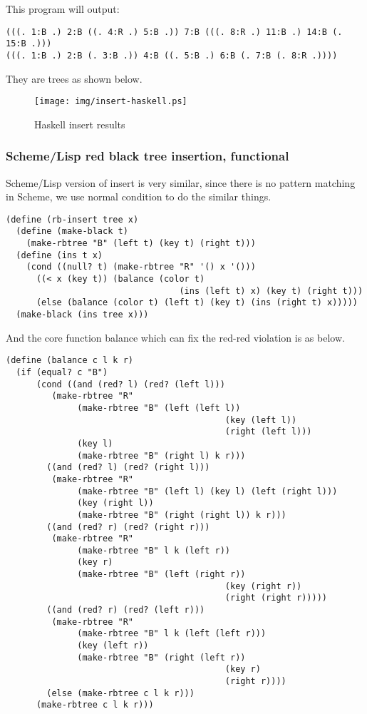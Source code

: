 \documentclass{article}
\begin{document}
This program will output:
\begin{verbatim}
(((. 1:B .) 2:B ((. 4:R .) 5:B .)) 7:B (((. 8:R .) 11:B .) 14:B (. 15:B .)))
(((. 1:B .) 2:B (. 3:B .)) 4:B ((. 5:B .) 6:B (. 7:B (. 8:R .))))
\end{verbatim}

They are trees as shown below.

\begin{figure}[htbp]
       \begin{center}
	\texttt{[image: img/insert-haskell.ps]}
        \caption{Haskell insert results} 
       \end{center}
\end{figure}

\subsubsection*{Scheme/Lisp red black tree insertion, functional}

Scheme/Lisp version of insert is very similar, since there is no pattern matching
in Scheme, we use normal condition to do the similar things.

\lstset{language=Lisp}
\begin{lstlisting}
(define (rb-insert tree x)
  (define (make-black t)
    (make-rbtree "B" (left t) (key t) (right t)))
  (define (ins t x)
    (cond ((null? t) (make-rbtree "R" '() x '()))
	  ((< x (key t)) (balance (color t) 
                                  (ins (left t) x) (key t) (right t)))
	  (else (balance (color t) (left t) (key t) (ins (right t) x)))))
  (make-black (ins tree x)))
\end{lstlisting}

And the core function balance which can fix the red-red violation is as below.

\begin{lstlisting}
(define (balance c l k r)
  (if (equal? c "B")
      (cond ((and (red? l) (red? (left l)))
	     (make-rbtree "R" 
			  (make-rbtree "B" (left (left l)) 
                                           (key (left l)) 
                                           (right (left l)))
			  (key l)
			  (make-rbtree "B" (right l) k r)))
	    ((and (red? l) (red? (right l)))
	     (make-rbtree "R"
			  (make-rbtree "B" (left l) (key l) (left (right l)))
			  (key (right l))
			  (make-rbtree "B" (right (right l)) k r)))
	    ((and (red? r) (red? (right r)))
	     (make-rbtree "R" 
			  (make-rbtree "B" l k (left r))
			  (key r)
			  (make-rbtree "B" (left (right r)) 
                                           (key (right r)) 
                                           (right (right r)))))
	    ((and (red? r) (red? (left r)))
	     (make-rbtree "R"
			  (make-rbtree "B" l k (left (left r)))
			  (key (left r))
			  (make-rbtree "B" (right (left r)) 
                                           (key r) 
                                           (right r))))
	    (else (make-rbtree c l k r)))
      (make-rbtree c l k r)))
\end{lstlisting}
\end{document}
